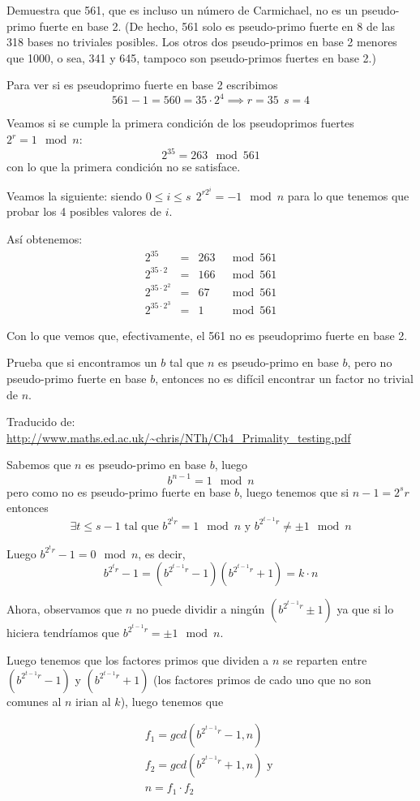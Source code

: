 \begin{problem}[17]
Demuestra que 561, que es incluso un número de Carmichael, no es un
pseudo-primo fuerte en base 2. (De hecho, 561 solo es pseudo-primo
fuerte en 8 de las 318 bases no triviales posibles. Los otros dos
pseudo-primos en base 2 menores que 1000, o sea, 341 y 645,
tampoco son pseudo-primos fuertes en base 2.)
\solution


Para ver si es pseudoprimo fuerte en base 2 escribimos
\[561 - 1 = 560 = 35 \cdot 2^4 \implies r=35 \ \ s=4\]

Veamos si se cumple la primera condición de los pseudoprimos fuertes $2^r = 1 \mod n$:
\[ 2^{35}=263 \mod 561 \]
con lo que la primera condición no se satisface.

Veamos la siguiente: siendo $0 \leq i \leq s \ \ 2^{r2^i}=-1 \mod n$ para lo que tenemos que probar los 4 posibles valores de $i$.

Así obtenemos:
\[\begin{array}{rcrl}
2^{35} & = & 263 & \mod 561 \\
2^{35\cdot 2} & = & 166  & \mod 561\\
2^{35 \cdot 2^2} & = & 67 & \mod 561\\
2^{35\cdot 2^3} & = & 1 & \mod 561
\end{array}\]

Con lo que vemos que, efectivamente, el 561 no es pseudoprimo fuerte en base 2.

\end{problem}

\begin{problem}[18]
Prueba que si encontramos un $b$ tal que $n$ es pseudo-primo en base
$b$, pero no pseudo-primo fuerte en base $b$, entonces no es
difícil encontrar un factor no trivial de $n$.
\solution
{}

Traducido de: \url{http://www.maths.ed.ac.uk/~chris/NTh/Ch4_Primality_testing.pdf}

Sabemos que $n$ es pseudo-primo en base $b$, luego
\[b^{n-1} = 1 \mod n\]
pero como no es pseudo-primo fuerte en base $b$, luego tenemos que si $n-1=2^{s}r$ entonces
\[\exists t\leq s-1 \text{ tal que } b^{2^{t}r} = 1 \mod n \text{ y } b^{2^{t-1}r} \neq \pm 1 \mod n\]

Luego $b^{2^{t}r} - 1 = 0 \mod n$, es decir,
\[b^{2^{t}r} - 1 = (b^{2^{t-1}r} - 1) (b^{2^{t-1}r} + 1) = k \cdot n\]

Ahora, observamos que $n$ no puede dividir a ningún $(b^{2^{t-1}r} \pm 1)$ ya que si lo hiciera tendríamos que $b^{2^{t-1}r} = \pm 1 \mod n$.

Luego tenemos que los factores primos que dividen a $n$ se reparten entre $(b^{2^{t-1}r} - 1)$ y $(b^{2^{t-1}r} + 1)$ (los factores primos de cado uno que no son comunes al $n$ irian al $k$), luego tenemos que

\begin{gather*}
f_1 = gcd(b^{2^{t-1}r} - 1,n)\\
f_2 = gcd(b^{2^{t-1}r} + 1,n) \text{ y }\\
n = f_1 \cdot f_2
\end{gather*}


\end{problem}

